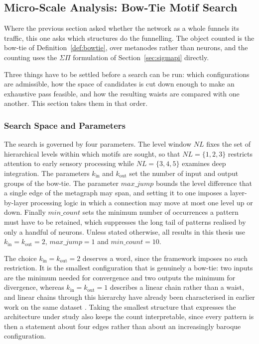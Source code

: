 \documentclass[12pt,a4paper,oneside]{article}
\theoremstyle{definition}
\theoremstyle{plain}
\newcommand{\kin}{k_{\mathrm{in}}}
\newcommand{\kout}{k_{\mathrm{out}}}
\newcommand{\sigmapi}{\ensuremath{\Sigma\Pi}}
\begin{document}
\subsection{Micro-Scale Analysis: Bow-Tie Motif Search}
\label{sec:micro-methods}


Where the previous section asked whether the network as a whole funnels its
traffic, this one asks which structures do the funnelling. The object counted
is the bow-tie of Definition~\ref{def:bowtie}, over metanodes rather than
neurons, and the counting uses the \sigmapi{} formulation of
Section~\ref{sec:sigmapi} directly.

Three things have to be settled before a search can be run: which
configurations are admissible, how the space of candidates is cut down
enough to make an exhaustive pass feasible, and how the resulting waists are
compared with one another. This section takes them in that order.

\subsubsection{Search Space and Parameters}

The search is governed by four parameters. The level window $NL$ fixes the
set of hierarchical levels within which motifs are sought, so that
$NL = \{1,2,3\}$ restricts attention to early sensory processing while
$NL = \{3,4,5\}$ examines deep integration. The parameters $\kin$ and
$\kout$ set the number of input and output groups of the bow-tie. The
parameter $\mathit{max\_jump}$ bounds the level difference that a single
edge of the metagraph may span, and setting it to one imposes a
layer-by-layer processing logic in which a connection may move at most one
level up or down. Finally $\mathit{min\_count}$ sets the minimum number of
occurrences a pattern must have to be retained, which suppresses the long
tail of patterns realised by only a handful of neurons. Unless stated
otherwise, all results in this thesis use $\kin = \kout = 2$,
$\mathit{max\_jump} = 1$ and $\mathit{min\_count} = 10$.

The choice $\kin = \kout = 2$ deserves a word, since the framework imposes no
such restriction. It is the smallest configuration that is genuinely a
bow-tie: two inputs are the minimum needed for convergence and two outputs
the minimum for divergence, whereas $\kin = \kout = 1$ describes a linear
chain rather than a waist, and linear chains through this hierarchy have
already been characterised in earlier work on the same dataset
\cite{curcio2026}. Taking the smallest structure that expresses the
architecture under study also keeps the count interpretable, since every
pattern is then a statement about four edges rather than about an
increasingly baroque configuration.
\end{document}
